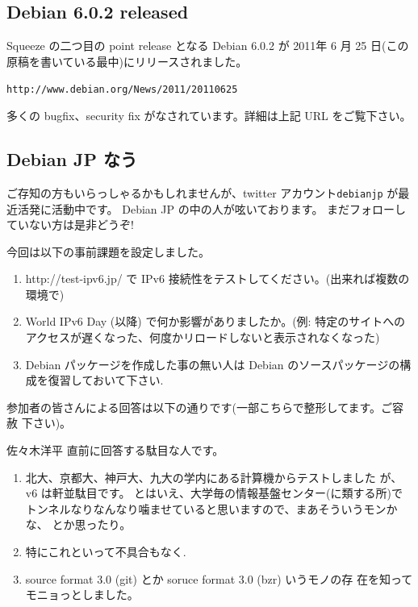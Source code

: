 \documentclass[mingoth,a4paper]{jsarticle}
\begin{document}
\subsection{Debian 6.0.2 released}

Squeeze の二つ目の point release となる Debian 6.0.2 が 2011年 6 月 25 日(この原稿を書いている最中)にリリースされました。
\begin{center}
  {\tt{http://www.debian.org/News/2011/20110625}}
\end{center}
多くの bugfix、security fix がなされています。詳細は上記 URL をご覧下さい。

\subsection{Debian JP なう}

ご存知の方もいらっしゃるかもしれませんが、twitter アカウント{\tt{debianjp}} が最近活発に活動中です。
Debian JP の中の人が呟いております。 まだフォローしていない方は是非どうぞ!

\clearpage

今回は以下の事前課題を設定しました。

\begin{enumerate}
\item http://test-ipv6.jp/ で IPv6 接続性をテストしてください。(出来れば複数の環境で)
\item World IPv6 Day (以降) で何か影響がありましたか。(例: 特定のサイトへのアクセスが遅くなった、何度かリロードしないと表示されなくなった)
\item Debian パッケージを作成した事の無い人は Debian のソースパッケージの構成を復習しておいて下さい.
\end{enumerate}

参加者の皆さんによる回答は以下の通りです(一部こちらで整形してます。ご容赦
下さい)。

\begin{prework}{ 佐々木洋平 }
  直前に回答する駄目な人です。
  \begin{enumerate}
  \item 北大、京都大、神戸大、九大の学内にある計算機からテストしました
    が、v6 は軒並駄目です。 とはいえ、大学毎の情報基盤センター(に類する所)で
    トンネルなりなんなり噛ませていると思いますので、まあそういうモンかな、
    とか思ったり。
  \item 特にこれといって不具合もなく.
  \item source format 3.0 (git) とか soruce format 3.0 (bzr) いうモノの存
    在を知ってモニョっとしました。
  \end{enumerate}
\end{prework}
\end{document}
